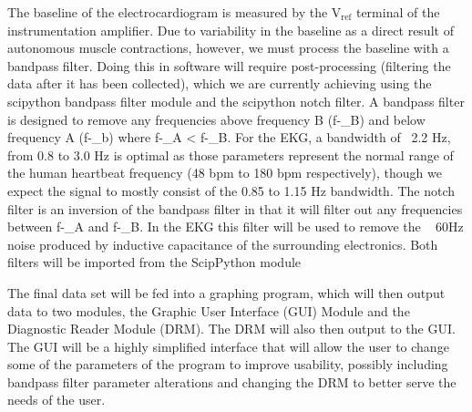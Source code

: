 \documentclass[11pt, oneside]{article}   	%
\begin{document}
\par 
The baseline of the electrocardiogram is measured by the $\text{V}_{\text{ref}}$ terminal of the instrumentation amplifier. Due to variability in the baseline as a direct result of autonomous muscle contractions, however, we must process the baseline with a bandpass filter. Doing this in software will require post-processing (filtering the data after it has been collected), which we are currently achieving using the scipython bandpass filter module and the scipython notch filter. A bandpass filter is designed to remove any frequencies above frequency B (f-_{B}) and below frequency A (f-_{b}) where f-_{A} < f-_{B}. For the EKG, a bandwidth of ~2.2 Hz, from 0.8 to 3.0 Hz is optimal as those parameters represent the normal range of the human heartbeat frequency (48 bpm to 180 bpm respectively), though we expect the signal to mostly consist of the 0.85 to 1.15 Hz bandwidth. The notch filter is an inversion of the bandpass filter in that it will filter out any frequencies between f-_{A} and f-_{B}. In the EKG this filter will be used to remove the ~ 60Hz noise produced by inductive capacitance of the surrounding electronics. Both filters will be imported from the ScipPython module \cite{SciPython}    

The final data set will be fed into a graphing program, which will then output data to two modules, the Graphic User Interface (GUI) Module and the Diagnostic Reader Module (DRM). The DRM will also then output to the GUI. The GUI will be a highly simplified interface that will allow the user to change some of the parameters of the program to improve usability, possibly including bandpass filter parameter alterations and changing the DRM to better serve the needs of the user. 
\end{document}

